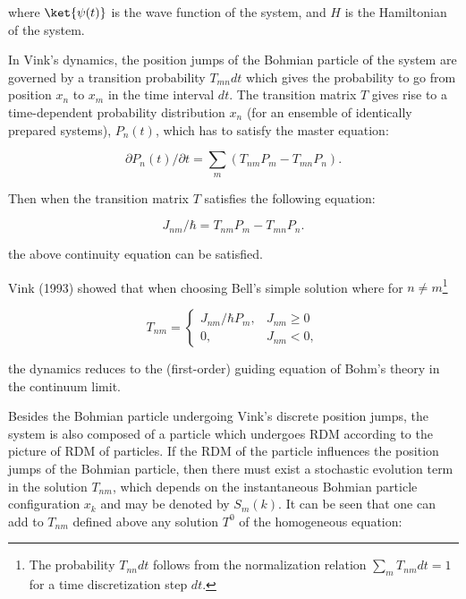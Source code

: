 \noindent where $\ket{\psi(t)}$ is the wave function of the system, and $H$ is the Hamiltonian of the system.

In Vink's dynamics, the position jumps of the Bohmian particle of the system are governed by a transition probability $T_{mn}dt$ which gives the probability to go from position $x_n$ to $x_m$ in the time interval $dt$. The transition matrix $T$ gives rise to a time-dependent probability distribution $x_n$ (for an ensemble of identically prepared systems), $P_n(t) $, which has to satisfy the master equation:

\begin{equation}
\partial P_n(t)/\partial t = \sum_m (T_{nm}P_m-T_{mn}P_n).
\end{equation}

\noindent Then when the transition matrix $T$ satisfies the following equation:

\begin{equation}
J_{nm}/\hbar = T_{nm}P_m-T_{mn}P_n.
\end{equation}

\noindent  the above continuity equation can be satisfied.

Vink (1993) showed that when choosing Bell's simple solution where for $n \neq m$\footnote{The probability $T_{nn}dt$ follows from the normalization relation $ \sum_m{T_{nm}dt}=1$ for a time discretization step $dt$.}

\begin{equation}
T_{nm}= 
\begin{cases} 
{J_{nm}/\hbar P_m},& J_{nm} \geq 0
\\
0,&J_{nm}<0,
\end{cases}
\end{equation}

\noindent the dynamics reduces to the (first-order) guiding equation of Bohm's theory in the continuum limit.

Besides the Bohmian particle undergoing Vink's discrete position jumps, the system is also composed of a particle which undergoes RDM according to the picture of RDM of particles.
If the RDM of the particle influences the position jumps of the Bohmian particle, then there must exist a stochastic evolution term in the solution $T_{nm}$, which depends on the instantaneous Bohmian particle configuration $x_k$ and may be denoted by $S_{m}(k)$. It can be seen that one can add to $T_{nm}$ defined above any solution $T^0$ of the homogeneous  equation:


